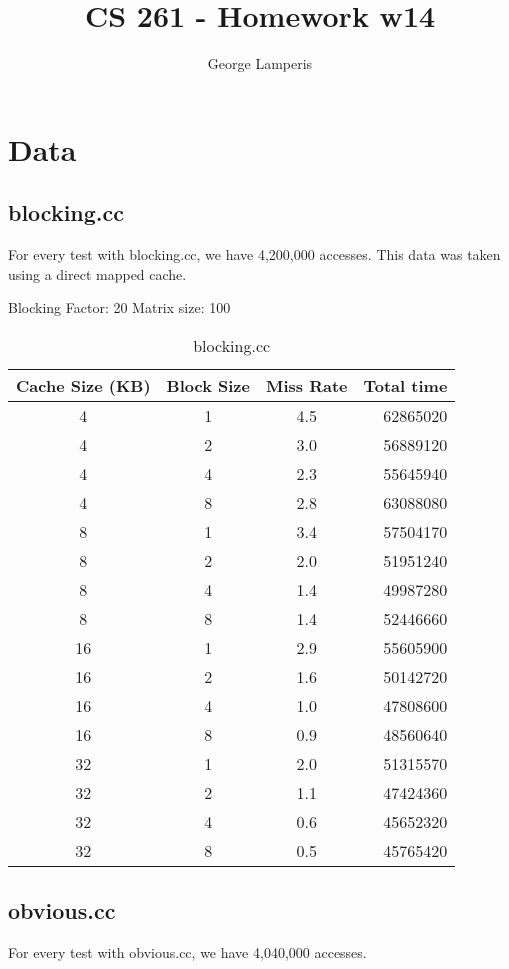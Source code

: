 \documentclass[letterpaper, 12pt, oneside]{memoir}
\title{CS 261 - Homework w14}
\author{George Lamperis}
\date{}
\begin{document}
\maketitle

\section{Data}

\subsection{blocking.cc}
For every test with blocking.cc, we have 4,200,000 accesses. This data 
was taken using a direct mapped cache.

Blocking Factor: 20
Matrix size: 100
\begin{table}[H]
\centering
\begin{tabular}{c|c|c|r}
    Cache Size (KB)  & Block Size & Miss Rate & Total time \\ \hline 
    4  & 1 & 4.5    & 62865020 \\
    4  & 2 & 3.0    & 56889120 \\
    4  & 4 & 2.3    & 55645940 \\
    4  & 8 & 2.8    & 63088080 \\ \hline
    8  & 1 & 3.4    & 57504170 \\
    8  & 2 & 2.0    & 51951240 \\
    8  & 4 & 1.4    & 49987280 \\
    8  & 8 & 1.4    & 52446660 \\ \hline
    16 & 1 & 2.9    & 55605900 \\
    16 & 2 & 1.6    & 50142720 \\
    16 & 4 & 1.0    & 47808600 \\
    16 & 8 & 0.9    & 48560640 \\ \hline
    32 & 1 & 2.0    & 51315570 \\
    32 & 2 & 1.1    & 47424360 \\
    32 & 4 & 0.6    & 45652320 \\
    32 & 8 & 0.5    & 45765420 \\
\end{tabular}
\caption{blocking.cc}
\end{table}

\subsection{obvious.cc}
For every test with obvious.cc, we have 4,040,000 accesses.
\end{document}
